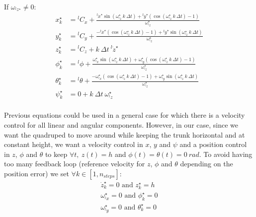 \documentclass[a4paper,11pt]{article}
\begin{document}
If $\omega_{{}^l\!z^\star} \neq 0$:
\begin{align}
x_k^\star &= {}^l\! C_x + \frac{{}^l\!\dot x^\star \sin(\omega_{{}^l\!z}^\star ~ k ~ \Delta t) + {}^l\!\dot y^\star \left( \cos(\omega_{{}^l\!z}^\star ~ k ~ \Delta t) - 1 \right)}{\omega_{{}^l\!z}^\star} \\
y_k^\star &= {}^l\! C_y + \frac{- {}^l\!\dot x^\star \left( \cos(\omega_{{}^l\!z}^\star ~ k ~ \Delta t) - 1 \right) + {}^l\!\dot y^\star \sin(\omega_{{}^l\!z}^\star ~ k ~ \Delta t)}{\omega_{{}^l\!z}^\star} \\
z_k^\star &= {}^l\! C_z + k ~ \Delta t ~  {}^l\! \dot z^\star \\
\phi_k^\star &= {}^l\! \phi + \frac{\omega_{{}^l\!x}^\star \sin(\omega_{{}^l\!z}^\star ~ k ~ \Delta t) + \omega_{{}^l\!y}^\star \left( \cos(\omega_{{}^l\!z}^\star ~ k ~ \Delta t) - 1 \right)}{\omega_{{}^l\!z}^\star} \\
\theta_k^\star &= {}^l\! \theta + \frac{- \omega_{{}^l\!x}^\star \left( \cos(\omega_{{}^l\!z}^\star ~ k ~ \Delta t) - 1 \right) + \omega_{{}^l\!y}^\star \sin(\omega_{{}^l\!z}^\star ~ k ~ \Delta t)}{\omega_{{}^l\!z}^\star} \\
\psi_k^\star &= 0 + k ~ \Delta t ~  \omega_{{}^l\!z}^\star \\
\end{align}


Previous equations could be used in a general case for which there is a velocity control for all linear and angular components. However, in our case, since we want the quadruped to move around while keeping the trunk horizontal and at constant height, we want a velocity control in $x$, $y$ and $\psi$ and a position control in $z$, $\phi$ and $\theta$ to keep $\forall t, ~z(t) = h$ and $\phi(t) = \theta(t) = 0~rad$. To avoid having too many feedback loop (reference velocity for $z$, $\phi$ and $\theta$ depending on the position error) we set $\forall k \in [1, n_{steps}]$:
\begin{align}
\dot z_k^\star = 0 \text{ and } z_k^\star = h \\
\omega_{{}^l\!x}^\star = 0 \text{ and }  \phi_k^\star = 0 \\
\omega_{{}^l\!y}^\star = 0 \text{ and }  \theta_k^\star = 0
\end{align}
\end{document}
